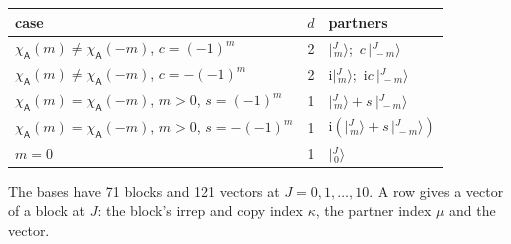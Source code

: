 \documentclass[10pt,a4paper]{article}
\numberwithin{equation}{section}
\newcommand{\grp}[1]{\mathsf{#1}}
\newcommand{\iunit}{\mathrm{i}}
\newcommand{\chiA}{\chi_{\grp{A}}}
\newcommand{\mult}{\kappa}
\newcommand{\intx}{\mu}
\newcommand{\jm}[2]{\bigl\lvert{}^{#1}_{\,#2}\bigr\rangle}
\begin{document}
\begin{center}\begin{tabular}{@{}lrl@{}}\toprule
case & $d$ & partners\\\midrule
$\chiA(m) \ne \chiA(-m)$, $c = (-1)^m$ & 2 & $\jm{J}{m}$;\ $c\,\jm{J}{-m}$\\
$\chiA(m) \ne \chiA(-m)$, $c = -(-1)^m$ & 2 & $\iunit\jm{J}{m}$;\ $\iunit c\,\jm{J}{-m}$\\
$\chiA(m) = \chiA(-m)$, $m > 0$, $s = (-1)^m$ & 1 & $\jm{J}{m} + s\,\jm{J}{-m}$\\
$\chiA(m) = \chiA(-m)$, $m > 0$, $s = -(-1)^m$ & 1 & $\iunit(\jm{J}{m} + s\,\jm{J}{-m})$\\
$m = 0$ & 1 & $\jm{J}{0}$\\
\bottomrule\end{tabular}\end{center}
The bases have 71 blocks and 121 vectors at $J = 0, 1, \dots, 10$. \label{n:head.vector}A row gives a vector of a block at $J$: the block's irrep and copy index $\mult$, the partner index $\intx$ and the vector.
\end{document}
